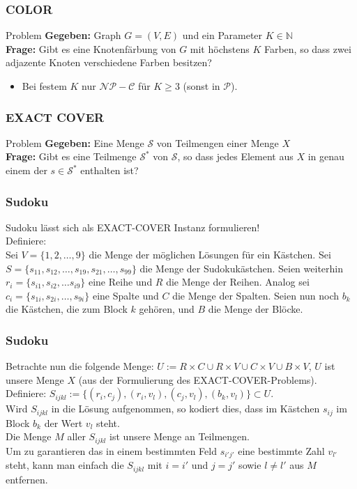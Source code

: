 \documentclass{beamer}
\begin{document}
{\begin{frame}
\frametitle{COLOR}
\begin{block}{Problem}
\textbf{Gegeben:} Graph $G = (V, E)$ und ein Parameter $K \in \mathbb{N}$\\
\textbf{Frage:} Gibt es eine Knotenfärbung von $G$ mit höchstens $K$ Farben, so dass zwei adjazente Knoten verschiedene Farben besitzen?
\end{block}
\begin{itemize}
\item Bei festem $K$ nur $\mathcal{NP-C}$ für $K \geq 3$ (sonst in $\mathcal{P}$).
\end{itemize}
\end{frame}
\begin{frame}
\frametitle{EXACT COVER}
\begin{block}{Problem}
\textbf{Gegeben:} Eine Menge $\mathcal{S}$ von Teilmengen einer Menge $X$\\
\textbf{Frage:} Gibt es eine Teilmenge $\mathcal{S}^*$ von $\mathcal{S}$, so dass jedes Element aus $X$ in genau einem der $s \in \mathcal{S}^*$ enthalten ist?
\end{block}
\end{frame}

\begin{frame}
\frametitle{Sudoku}
Sudoku lässt sich als EXACT-COVER Instanz formulieren!\\
Definiere:\\
Sei $V = \{1,2,\ldots,9\}$ die Menge der möglichen Lösungen für ein Kästchen.
Sei $S = \{s_{11}, s_{12},\ldots,s_{19},s_{21},\ldots,s_{99}\}$ die Menge der Sudokukästchen.
Seien weiterhin $r_i = \{s_{i1}, s_{i2}, \ldots s_{i9}\}$ eine Reihe und $R$ die Menge der Reihen.
Analog sei $c_i = \{s_{1i}, s_{2i}, \ldots, s_{9i}\}$ eine Spalte und $C$ die Menge der Spalten.
Seien nun noch $b_k$ die Kästchen, die zum Block $k$ gehören, und $B$ die Menge der Blöcke.
\end{frame}

\begin{frame}
\frametitle{Sudoku}
Betrachte nun die folgende Menge: $U := R \times C \cup R \times V \cup C \times V \cup B \times V$, $U$ ist unsere Menge $X$ (aus der Formulierung des EXACT-COVER-Problems).\\
Definiere: $S_{ijkl} := \{(r_i,c_j),(r_i,v_l),(c_j,v_l),(b_k,v_l)\} \subset U$.\\[8pt]
Wird $S_{ijkl}$ in die Lösung aufgenommen, so kodiert dies, dass im Kästchen $s_{ij}$ im Block $b_k$ der Wert $v_l$ steht.\\
Die Menge $M$ aller $S_{ijkl}$ ist unsere Menge an Teilmengen.\\
Um zu garantieren das in einem bestimmten Feld $s_{i'j'}$ eine bestimmte Zahl $v_{l'}$ steht, kann man einfach die $S_{ijkl}$ mit $i = i'$ und $j = j'$ sowie $l \neq l'$ aus $M$ entfernen.
\end{frame}

}
\end{document}
